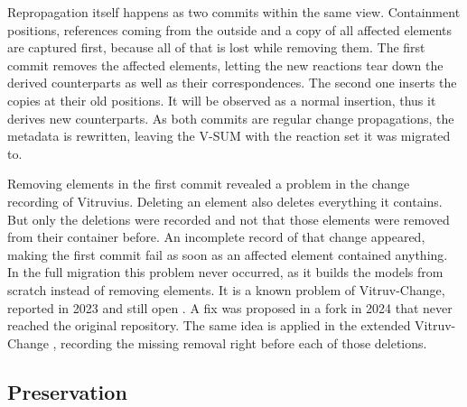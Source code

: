 Repropagation itself happens as two commits within the same view.
Containment positions, references coming from the outside and a copy of all affected elements are captured first, because all of that is lost while removing them.
The first commit removes the affected elements, letting the new reactions tear down the derived counterparts as well as their correspondences.
The second one inserts the copies at their old positions.
It will be observed as a normal insertion, thus it derives new counterparts.
As both commits are regular change propagations, the metadata is rewritten, leaving the V-SUM with the reaction set it was migrated to.

Removing elements in the first commit revealed a problem in the change recording of Vitruvius.
Deleting an element also deletes everything it contains.
But only the deletions were recorded and not that those elements were removed from their container before.
An incomplete record of that change appeared, making the first commit fail as soon as an affected element contained anything.
In the full migration this problem never occurred, as it builds the models from scratch instead of removing elements.
It is a known problem of Vitruv-Change, reported in 2023 and still open \cite{vitruv-change-issue}.
A fix was proposed in a fork in 2024 that never reached the original repository.
The same idea is applied in the extended Vitruv-Change \cite{vitruv-change-fork}, recording the missing removal right before each of those deletions.

\subsection{Preservation}
\label{sec:Implementation:Migration:Preservation}

